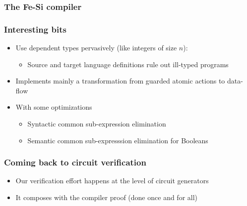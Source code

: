 \documentclass[9pt]{beamer}
\begin{document}
\begin{frame}
  \frametitle{The Fe-Si  compiler}
  \frametitle{Interesting bits}
  \begin{itemize}
  \item Use dependent types pervasively (like integers of size $n$):
    \begin{itemize}
    \item Source and target language definitions rule out ill-typed
      programs
    \end{itemize}

    \item Implements mainly a transformation from guarded atomic actions to data-flow
    \item With some optimizations
      \begin{itemize}
      \item Syntactic common sub-expression elimination 
      \item Semantic common sub-expresssion elimination for Booleans
      \end{itemize}
 
  \end{itemize}
\end{frame}

\begin{frame}
  \frametitle{Coming back to circuit verification}
  \begin{center}
 \end{center}
\medskip

\begin{itemize}
\item Our verification effort happens at the level of \alert{circuit
      generators}
   
  \item  It composes with the compiler proof (done \alert{once and for all})
  \end{itemize}
\end{frame}
\end{document}
